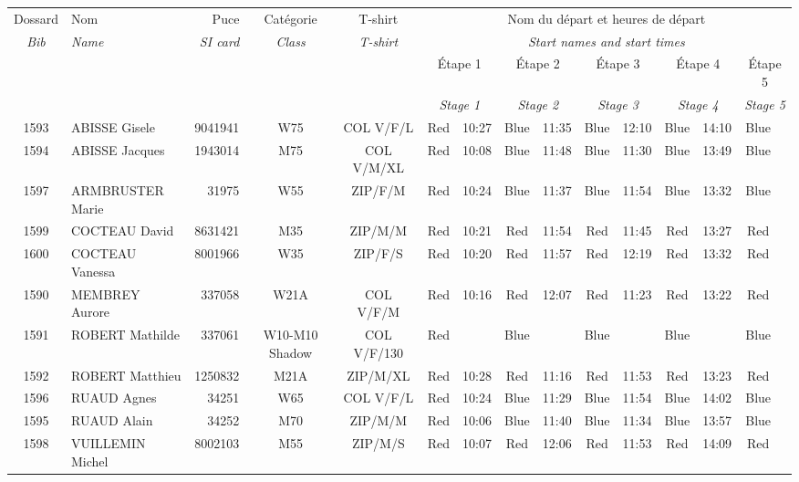 \documentclass{report}
\begin{document}
  \begin{longtable}{|c|l|r|c|c|*{5}{cc|}}
    Dossard & Nom  & Puce    & Catégorie & T-shirt & \multicolumn{10}{c|}{Nom du départ et heures de départ} \\
    \itshape Bib     & \itshape Name & \itshape SI card & \itshape Class  & \itshape  T-shirt  & \multicolumn{10}{c|}{\itshape Start names and start times} \\
    \hline
    & & & & & \multicolumn{2}{c|}{Étape 1} & \multicolumn{2}{c|}{Étape 2} & \multicolumn{2}{c|}{Étape 3} & \multicolumn{2}{c|}{Étape 4} & \multicolumn{2}{c|}{Étape 5} \\
    & & & & & \multicolumn{2}{c|}{\itshape Stage 1} & \multicolumn{2}{c|}{\itshape Stage 2} & \multicolumn{2}{c|}{\itshape Stage 3} & \multicolumn{2}{c|}{\itshape Stage 4} & \multicolumn{2}{c|}{\itshape Stage 5} \\
    \hline
    1593 & ABISSE Gisele & 9041941 & W75 & COL V/F/L & Red & 10:27 & Blue & 11:35 & Blue & 12:10 & Blue & 14:10 & Blue &  \\
    1594 & ABISSE Jacques & 1943014 & M75 & COL V/M/XL & Red & 10:08 & Blue & 11:48 & Blue & 11:30 & Blue & 13:49 & Blue &  \\
    1597 & ARMBRUSTER Marie & 31975 & W55 & ZIP/F/M & Red & 10:24 & Blue & 11:37 & Blue & 11:54 & Blue & 13:32 & Blue &  \\
    1599 & COCTEAU David & 8631421 & M35 & ZIP/M/M & Red & 10:21 & Red & 11:54 & Red & 11:45 & Red & 13:27 & Red &  \\
    1600 & COCTEAU Vanessa & 8001966 & W35 & ZIP/F/S & Red & 10:20 & Red & 11:57 & Red & 12:19 & Red & 13:32 & Red &  \\
    1590 & MEMBREY Aurore & 337058 & W21A & COL V/F/M & Red & 10:16 & Red & 12:07 & Red & 11:23 & Red & 13:22 & Red &  \\
    1591 & ROBERT Mathilde & 337061 & W10-M10 Shadow & COL V/F/130 & Red &   & Blue &   & Blue &   & Blue &   & Blue &  \\
    1592 & ROBERT Matthieu & 1250832 & M21A & ZIP/M/XL & Red & 10:28 & Red & 11:16 & Red & 11:53 & Red & 13:23 & Red &  \\
    1596 & RUAUD Agnes & 34251 & W65 & COL V/F/L & Red & 10:24 & Blue & 11:29 & Blue & 11:54 & Blue & 14:02 & Blue &  \\
    1595 & RUAUD Alain & 34252 & M70 & ZIP/M/M & Red & 10:06 & Blue & 11:40 & Blue & 11:34 & Blue & 13:57 & Blue &  \\
    1598 & VUILLEMIN Michel & 8002103 & M55 & ZIP/M/S & Red & 10:07 & Red & 12:06 & Red & 11:53 & Red & 14:09 & Red &  \\
  \end{longtable}
\end{document}
